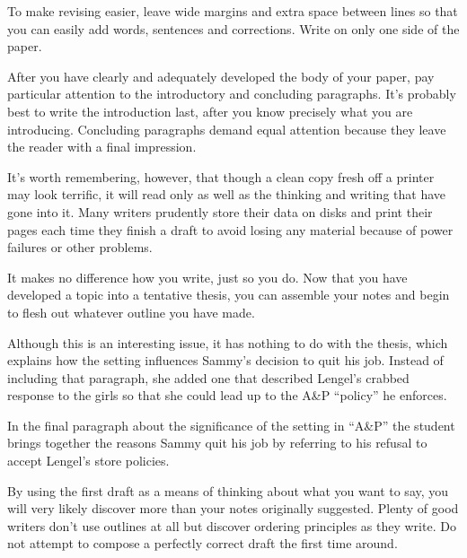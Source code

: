 \begin{listmatch}
	\item
To make revising easier, leave wide margins and extra space
between lines so that you can easily add words, sentences and
corrections. Write on only one side of the paper.


\item 
After you have clearly and adequately developed the body of your
paper, pay particular attention to the introductory and concluding
paragraphs. It's probably best to write the introduction last, after you
know precisely what you are introducing. Concluding paragraphs demand
equal attention because they leave the reader with a final impression.


\item 
 It's worth remembering, however, that though a clean copy fresh
off a printer may look terrific, it will read only as well as the
thinking and writing that have gone into it. Many writers prudently
store their data on disks and print their pages each time they finish a
draft to avoid losing any material because of power failures or other
problems.


\item 
 It makes no difference how you write, just so you do. Now that
you have developed a topic into a tentative thesis, you can assemble
your notes and begin to flesh out whatever outline you have made.


\item 
Although this is an interesting issue, it has nothing to do with
the thesis, which explains how the setting influences Sammy's decision
to quit his job. Instead of including that paragraph, she added one that
described Lengel's crabbed response to the girls so that she could lead
up to the A\&P ``policy'' he enforces.


\item 
 In the final paragraph about the significance of the setting in
``A\&P'' the student brings together the reasons Sammy quit his job by
referring to his refusal to accept Lengel's store policies.


\item 
By using the first draft as a means of thinking about what you
want to say, you will very likely discover more than your notes
originally suggested. Plenty of good writers don't use outlines at all
but discover ordering principles as they write. Do not attempt to
compose a perfectly correct draft the first time around.

\end{listmatch}




